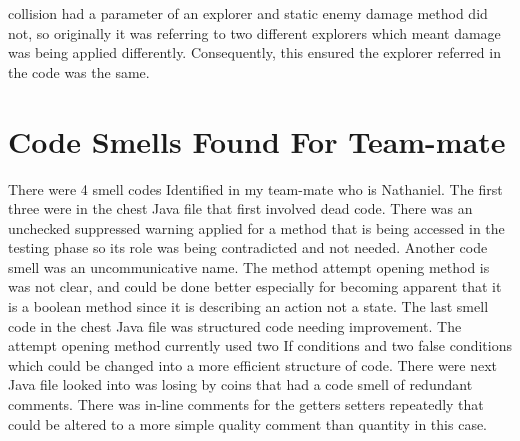 \documentclass[12pt,letterpaper]{article}
\begin{document}
collision had a parameter of an explorer and static enemy damage method did not, so originally it was referring to two different explorers which meant damage was being applied differently. Consequently, this ensured the explorer referred in the code was the same.

\section{Code Smells Found For Team-mate}
There were 4 smell codes Identified in my team-mate who is Nathaniel. The first three were in the chest Java file that first involved dead code. There was an unchecked suppressed warning applied for a method that is being accessed in the testing phase so its role was being contradicted and not needed. Another code smell was an uncommunicative name. The method attempt opening method is was not clear, and could be done better especially for becoming apparent that it is a boolean method since it is describing an action not a state. The last smell code in the chest Java file was structured code needing improvement. The attempt opening method currently used two If conditions and two false conditions which could be changed into a more efficient structure of code. There were next Java file looked into was losing by coins that had a code smell of redundant comments. There was in-line comments for the getters setters repeatedly that could be altered to a more simple quality comment than quantity in this case.

\end{document}
